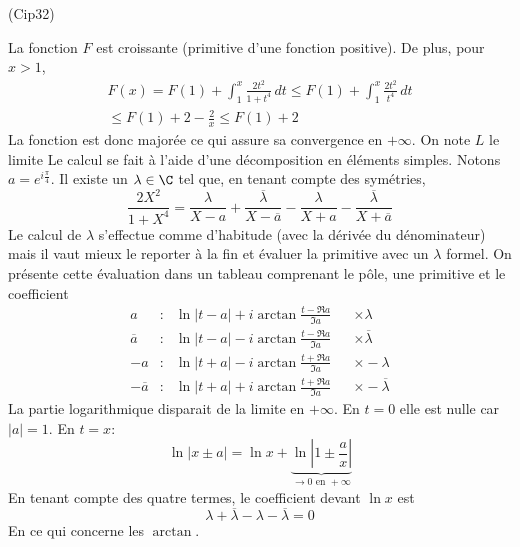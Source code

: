 \begin{tiny}(Cip32)\end{tiny} La fonction $F$ est croissante (primitive d'une fonction positive). De plus, pour $x>1$,
\begin{multline*}
F(x) = F(1) + \int_1^x\frac{2t^2}{1+t^4}\,dt
\leq F(1) + \int_1^x\frac{2t^2}{t^4}\,dt \\
\leq F(1) + 2 - \frac{2}{x} \leq F(1) + 2
\end{multline*}
La fonction est donc majorée ce qui assure sa convergence en $+\infty$. On note $L$ le limite\newline
Le calcul se fait à l'aide d'une décomposition en éléments simples. Notons $a=e^{i\frac{\pi}{4}}$. Il existe un $\lambda\in \C$ tel que, en tenant compte des symétries,
\begin{displaymath}
\frac{2X^2}{1+X^4}
= \frac{\lambda}{X-a} + \frac{\overline{\lambda}}{X-\overline{a}}  - \frac{\lambda}{X+a}  - \frac{\overline{\lambda}}{X+\overline{a}}  
\end{displaymath}
Le calcul de $\lambda$ s'effectue comme d'habitude (avec la dérivée du dénominateur) mais il vaut mieux le reporter à la fin et évaluer la primitive avec un $\lambda$ formel.\newline
On présente cette évaluation dans un tableau comprenant le pôle, une primitive et le coefficient
\begin{align*}
a             &:  &\ln|t-a| + i\arctan \frac{t - \Re a}{\Im a} & &\times \lambda \\
\overline{a}  &:  &\ln|t-a| - i\arctan \frac{t - \Re a}{\Im a} & &\times \overline{\lambda} \\
-a            &:  &\ln|t+a| - i\arctan \frac{t + \Re a}{\Im a} & &\times -\lambda \\
-\overline{a} &:  &\ln|t+a| + i\arctan \frac{t + \Re a}{\Im a} & &\times -\overline{\lambda}
\end{align*}
La partie logarithmique disparait de la limite en $+\infty$. En $t=0$ elle est nulle car $|a|=1$. En $t=x$:
\begin{displaymath}
\ln|x \pm a| = \ln x + \underset{\rightarrow 0 \text{ en }+\infty}{\underbrace{\ln|1 \pm \frac{a}{x}|}}
\end{displaymath}
En tenant compte des quatre termes, le coefficient devant $\ln x$ est
\begin{displaymath}
  \lambda + \overline{\lambda} - \lambda - \overline{\lambda} = 0  
\end{displaymath}
En  ce qui concerne les $\arctan$.\newline
